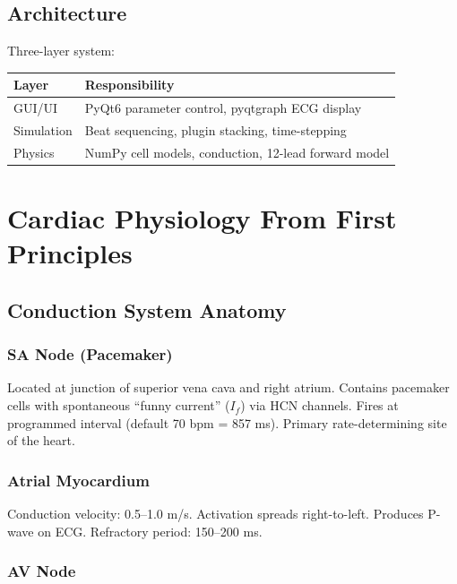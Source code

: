 \documentclass[12pt]{book}
\begin{document}
\section{Architecture}

Three-layer system:

\begin{tabular}{|l|l|}
\hline
\textbf{Layer} & \textbf{Responsibility} \\
\hline
GUI/UI & PyQt6 parameter control, pyqtgraph ECG display \\
Simulation & Beat sequencing, plugin stacking, time-stepping \\
Physics & NumPy cell models, conduction, 12-lead forward model \\
\hline
\end{tabular}


\chapter{Cardiac Physiology From First Principles}

\section{Conduction System Anatomy}

\subsection{SA Node (Pacemaker)}

Located at junction of superior vena cava and right atrium. Contains pacemaker cells with spontaneous ``funny current'' ($I_f$) via HCN channels. Fires at programmed interval (default 70 bpm = 857 ms). Primary rate-determining site of the heart.

\subsection{Atrial Myocardium}

Conduction velocity: 0.5--1.0 m/s. Activation spreads right-to-left. Produces P-wave on ECG. Refractory period: 150--200 ms.

\subsection{AV Node}
\end{document}
